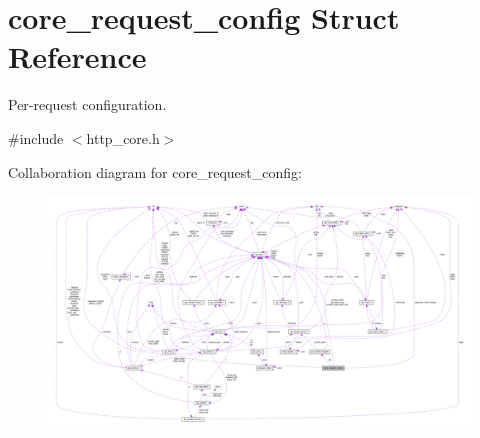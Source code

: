 \hypertarget{structcore__request__config}{}\section{core\+\_\+request\+\_\+config Struct Reference}
\label{structcore__request__config}


Per-\/request configuration.  




{\ttfamily \#include $<$http\+\_\+core.\+h$>$}



Collaboration diagram for core\+\_\+request\+\_\+config\+:
\nopagebreak
\begin{figure}[H]
\begin{center}
\leavevmode
\includegraphics[width=350pt]{structcore__request__config__coll__graph}
\end{center}
\end{figure}
